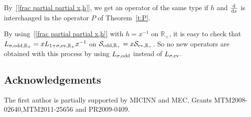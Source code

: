 \documentclass[pdftex]{sigma}
\newcommand{\R}{\mathbb{R}}
\renewcommand{\SS}{\mathcal{S}}
\begin{document}
\begin{Remark}\label{r:Q}
  By~\eqref{[frac partial partial x,h]}, we get an operator of the same type if $h$ and $\frac{{\rm d}}{{\rm d}x}$ is interchanged in the operator $P$ of Theorem~\ref{t:P}.
\end{Remark}

\begin{Remark}
By using~\eqref{[frac partial partial x,h]} with $h=x^{-1}$ on $\R_+$, it is easy to check that $L_{\sigma,\text{\rm odd},\R_+}=xL_{1+\sigma,\text{\rm ev},\R_+}x^{-1}$ on $\SS_{\text{\rm odd},\R_+}=x \SS_{\text{\rm ev},\R_+}$. So no new operators are obtained with this process by using $L_{\sigma,\text{\rm odd}}$ instead of $L_{\sigma,\text{\rm ev}}$.
\end{Remark}


\subsection*{Acknowledgements}

The f\/irst author is partially supported by MICINN and MEC, Grants MTM2008-02640,\linebreak  MTM2011-25656  and PR2009-0409.
\end{document}
